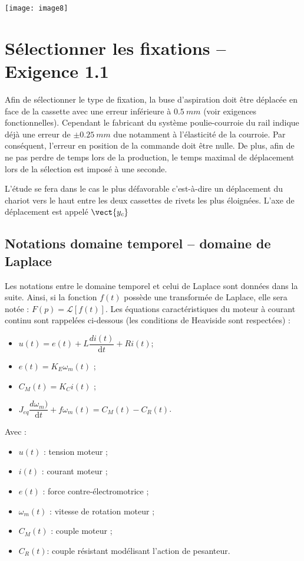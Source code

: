 \begin{multicols}{2}
\begin{center}
\texttt{[image: image8]}
\end{center} 


\fi




\section*{Sélectionner les fixations – Exigence 1.1}
\ifprof
\else 
Afin de sélectionner le type de fixation, la buse d'aspiration doit être déplacée en face de la cassette avec une erreur inférieure à $\SI{0,5}{mm}$ (voir exigences fonctionnelles). Cependant le fabricant du système poulie-courroie du rail indique déjà une erreur de $\pm \SI{0,25}{mm}$ due notamment à l'élasticité de la courroie. Par conséquent, l'erreur en position de la commande doit être nulle. De plus, afin de ne pas perdre de temps lors de la production, le temps maximal de déplacement lors de la sélection est imposé à une seconde.

L'étude se fera dans le cas le plus défavorable c'est-à-dire un déplacement du chariot vers le haut entre les deux cassettes de rivets les plus éloignées. L'axe de déplacement est appelé $\vect{y_c}$
\subsection*{Notations domaine temporel – domaine de Laplace}

Les notations entre le domaine temporel et celui de Laplace sont données dans la suite. Ainsi, si la fonction $f(t)$ possède une transformée de Laplace, elle sera notée : $F(p) = \mathcal{L}[f(t)]$.
Les équations caractéristiques du moteur à courant continu sont rappelées ci-dessous (les conditions de Heaviside sont respectées) :
\begin{itemize}[label=,font=\color{bleuxp}] 
\item $u(t)=e(t)+L \dfrac{di(t)}{\text{d} t}+Ri(t)$;
\item $e(t)=K_E \omega_m (t)$ ;
\item $C_M (t)=K_C i(t)$ ;
\item $J_{eq}  \dfrac{d\omega_m)}{\text{d} t}+f\omega_m (t)=C_M (t)-C_R (t)$.
\end{itemize}

Avec : 
\begin{itemize}[label=,font=\color{bleuxp}] 
\item $u(t)$ : tension moteur ;
\item $i(t)$ : courant moteur ; 
\item $e(t)$ : force contre-électromotrice ;
\item $\omega_m(t)$ : vitesse de rotation moteur ;
\item $C_M (t)$ : couple moteur ;
\item $C_R (t)$: couple résistant modélisant l'action de pesanteur.
\end{itemize}
\fi


\end{multicols}
